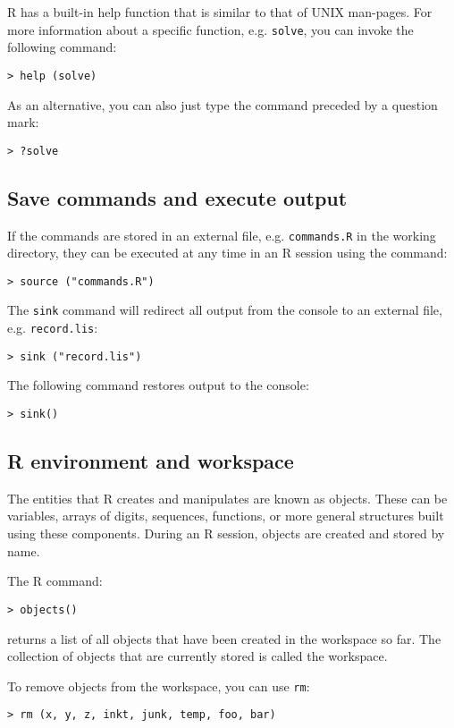 R has a built-in help function that is similar to that of UNIX man-pages. For more information about a specific function, e.g. \texttt{solve}, you can invoke the following command:
\begin{lstlisting}
> help (solve)
\end{lstlisting}

As an alternative, you can also just type the command preceded by a question mark:
\begin{lstlisting}
> ?solve
\end{lstlisting}


\subsection{Save commands and execute output}

If the commands are stored in an external file, e.g. \texttt{commands.R} in the working directory, they can be executed at any time in an R session using the command:
\begin{lstlisting}
> source ("commands.R")
\end{lstlisting}

The \texttt{sink} command will redirect all output from the console to an external file, e.g. \texttt{record.lis}:
\begin{lstlisting}
> sink ("record.lis")
\end{lstlisting}

The following command restores output to the console:
\begin{lstlisting}
> sink()
\end{lstlisting}

\subsection{R environment and workspace}

The entities that R creates and manipulates are known as objects. These can be variables, arrays of digits, sequences, functions, or more general structures built using these components. During an R session, objects are created and stored by name.

The R command:
\begin{lstlisting}
> objects()
\end{lstlisting}
returns a list of all objects that have been created in the workspace so far.
The collection of objects that are currently stored is called the workspace.

To remove objects from the workspace, you can use \texttt{rm}:
\begin{lstlisting}
> rm (x, y, z, inkt, junk, temp, foo, bar)
\end{lstlisting}

